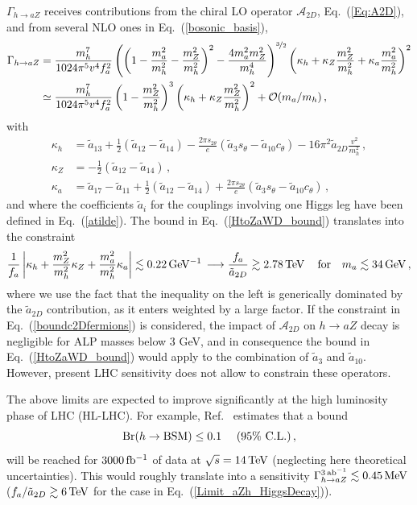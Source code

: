 \documentclass[11pt]{article}
\newcommand{\A}{\mathcal{A}}
\newcommand{\at}{\tilde{a}}
\newcommand{\st}{s_\theta}
\newcommand{\ct}{c_\theta}
\newcommand{\sdt}{s_{2\theta}}
\DeclareMathOperator{\Br}{Br}
\newcommand{\cl}{\%\,\,  \text{C.L.}}
\renewcommand{\to}{\rightarrow}
\newcommand{\beq}{\begin{equation}}
\newcommand{\eeq}{\end{equation}}
\renewcommand{\[}{\begin{equation}}
\renewcommand{\]}{\end{equation}}
\begin{document}
%
%
$\Gamma_{h \to aZ}$ receives contributions from the chiral LO operator $\A_{2D}$, Eq.~(\ref{Eq:A2D}), and from several NLO  ones in Eq.~(\ref{bosonic_basis}),  
\beq
\begin{aligned}
\Gamma_{h \to aZ} &= \frac{m_h^7}{1024\pi^5 v^4 f_a^2} \left(\left(1-\frac{m_a^2}{m_h^2}-\frac{m_Z^2}{m_h^2}\right)^2-\frac{4m_a^2m_Z^2}{m_h^4}\right)^{\nicefrac{3}{2}} 
\left(\kappa_h+\kappa_Z \frac{m_Z^2}{m_h^2}+\kappa_a \frac{m_a^2}{m_h^2} \right)^2\\
&\simeq \frac{m_h^7}{1024\pi^5 v^4 f_a^2}\left(1-\frac{m_Z^2}{m_h^2}\right)^3\left( \kappa_h+\kappa_Z \frac{m_Z^2}{m_h^2}\right)^2+\mathcal{O}(m_a/m_h)\,,
\end{aligned}
\eeq
%
with
\beq
\begin{aligned}
\kappa_h&=\at_{13}+\frac{1}{2}(\at_{12}-\at_{14})-\frac{2\pi\sdt}{e}(\at_3\st-\at_{10}\ct)-16\pi^2\tilde{a}_{2D}\frac{v^2}{m_h^2} \label{Hinv_bound_kh}\,,\\
\kappa_Z &= -\frac{1}{2}(\at_{12}-\at_{14})\,,\\
\kappa_a&=\at_{17}-\at_{11}+\frac{1}{2}(\at_{12}-\at_{14})+\frac{2\pi\sdt}{e}(\at_3\st-\at_{10}\ct)\,,
\end{aligned}
\eeq
and where the coefficients $\tilde{a}_i$ for the couplings involving one Higgs leg  have been defined in Eq.~(\ref{atilde}). The bound in Eq.~(\ref{HtoZaWD_bound}) 
translates into the constraint 
\begin{equation}
\label{Limit_aZh_HiggsDecay}
\dfrac{1}{f_a} \left|\kappa_h+\dfrac{m_Z^2}{m_h^2} \kappa_Z +\dfrac{m_a^2}{m_h^2} \kappa_a\right| \lesssim \unit[0.22]{GeV^{-1}}  \, 
  \longrightarrow   \frac{f_a}{\tilde{a}_{2D}} \gtrsim \unit[2.78]{TeV}\,  \quad \text{for}\quad  m_a \lesssim \unit[34]{GeV}\,,
\end{equation} 
where we use the fact that  the inequality on the left is generically dominated by the $\tilde{a}_{2D}$ contribution, as it enters weighted by a large factor. If 
the constraint in Eq.~(\ref{boundc2Dfermions}) is considered, the impact of $\A_{2D}$ on $h \to aZ$ decay is negligible for ALP masses below $3$ GeV, and in consequence 
the bound in Eq.~(\ref{HtoZaWD_bound}) would apply to the combination of  $\at_3$ and $\at_{10}$. However, present LHC sensitivity does not allow to constrain these operators.



The above limits are expected to improve significantly at the high luminosity phase of LHC (HL-LHC). For example, Ref.~\cite{ATL-PHYS-PUB-2014-016} estimates that a bound
\begin{equation}
\Br (h\to {\rm BSM}) \leq 0.1\quad\,\, (95\cl)\,,
\end{equation} 
will be reached for $\unit[3000]{fb^{-1}}$ of data at $\sqrt s=\unit[14]{TeV}$ (neglecting here theoretical uncertainties). 
This would roughly translate into a sensitivity $\Gamma_{h \to aZ}^{\unit[3]{ab^{-1}}} \lesssim \unit[0.45]{MeV}$ ($f_a/\at_{2D} \gtrsim \unit[6]{TeV}$ for the case in 
Eq.~(\ref{Limit_aZh_HiggsDecay})).
\end{document}

